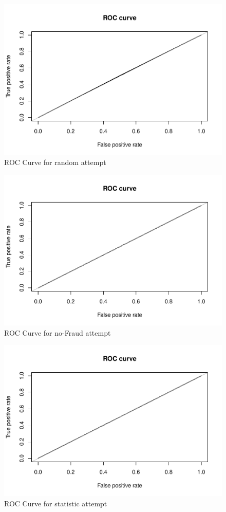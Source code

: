 \documentclass[
]{article}
\begin{document}
\begin{figure}[H]

{\centering \includegraphics[width=0.7\linewidth]{fraudDetectionReport_files/figure-latex/random_attempt-1} 

}

\caption{ROC Curve for random attempt}\label{fig:random_attempt}
\end{figure}
\begin{figure}[H]

{\centering \includegraphics[width=0.7\linewidth]{fraudDetectionReport_files/figure-latex/noFraud_attempt-1} 

}

\caption{ROC Curve for no-Fraud attempt}\label{fig:noFraud_attempt}
\end{figure}
\begin{figure}[H]

{\centering \includegraphics[width=0.7\linewidth]{fraudDetectionReport_files/figure-latex/dummyStatistic_attempt-1} 

}

\caption{ROC Curve for statistic attempt}\label{fig:dummyStatistic_attempt}
\end{figure}
\end{document}
